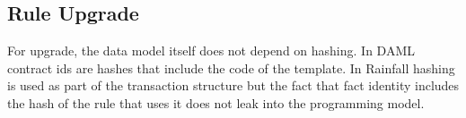 \subsection{Rule Upgrade}
For upgrade, the data model itself does not depend on hashing. In DAML contract ids are hashes that include the code of the template. In Rainfall hashing is used as part of the transaction structure but the fact that fact identity includes the hash of the rule that uses it does not leak into the programming model.






